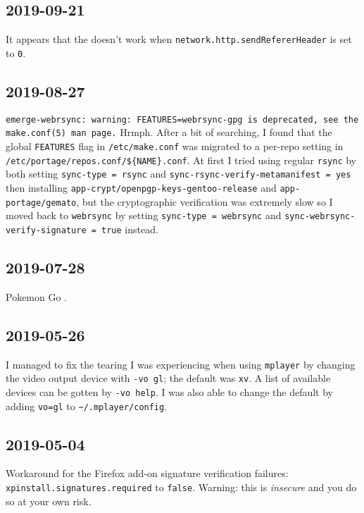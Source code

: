 \documentclass{article}
\begin{document}
\subsection{2019-09-21}
It appears that the  doesn't work when \texttt{network.http.sendRefererHeader} is set to \texttt{0}.

\subsection{2019-08-27}
\verb|emerge-webrsync: warning: FEATURES=webrsync-gpg is deprecated, see the make.conf(5) man page.|  Hrmph.  After a bit of searching, I found that the global \texttt{FEATURES} flag in \texttt{/etc/make.conf} was migrated to a per-repo setting in \verb|/etc/portage/repos.conf/${NAME}.conf|.  At first I tried using regular \texttt{rsync} by both setting \texttt{sync-type = rsync} and \texttt{sync-rsync-verify-metamanifest = yes} then installing \texttt{app-crypt/openpgp-keys-gentoo-release} and \texttt{app-portage/gemato}, but the cryptographic verification was extremely slow so I moved back to \texttt{webrsync} by setting \texttt{sync-type = webrsync} and \texttt{sync-webrsync-verify-signature = true} instead.

\subsection{2019-07-28}
Pokemon Go .

\subsection{2019-05-26}
I managed to fix the tearing I was experiencing when using \texttt{mplayer} by changing the video output device with \texttt{-vo gl}; the default was \texttt{xv}.  A list of available devices can be gotten by \texttt{-vo help}.  I was also able to change the default by adding \texttt{vo=gl} to \verb|~/.mplayer/config|.

\subsection{2019-05-04}
Workaround for the Firefox add-on signature verification failures: \texttt{xpinstall.signatures.required} to \texttt{false}.  Warning: this is \emph{insecure} and you do so at your own risk.
\end{document}
